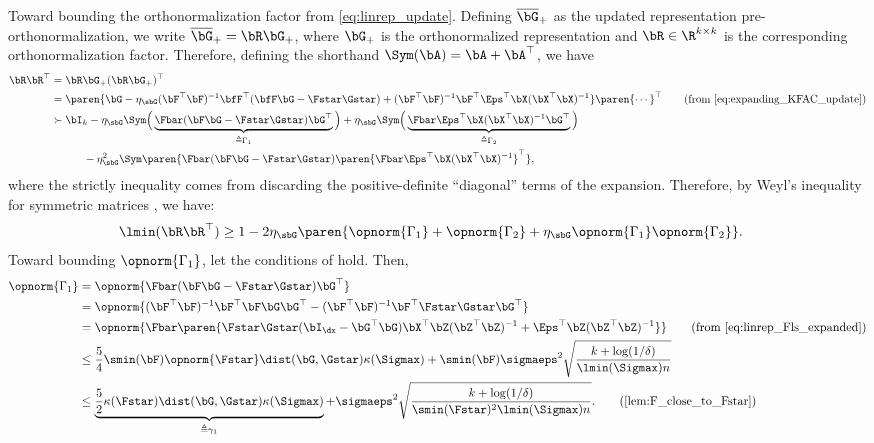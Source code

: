 Toward bounding the orthonormalization factor from \eqref{eq:linrep_update}. Defining $\overline\bG_+$ as the updated representation pre-orthonormalization, we write $\overline\bG_+ = \bR \bG_+$,
where $\bG_+$ is the orthonormalized representation and $\bR \in \R^{k \times k}$ is the corresponding orthonormalization factor. Therefore, defining the shorthand $\Sym(\bA) = \bA + \bA^\top$, we have
\begin{align*}
    \bR\bR^\top &= \bR \bG_+ (\bR \bG_+)^\top \\
    &= \paren{\bG - \eta_\sbG (\bF^\top \bF)^{-1}\bfF^\top (\bfF \bG - \Fstar \Gstar) + (\bF^\top \bF)^{-1}\bF^\top \Eps^\top \bX (\bX^\top \bX)^{-1}} \paren{\cdots}^\top \tag{from \eqref{eq:expanding_KFAC_update}}\\
    &\succ \bI_{k} - \eta_\sbG \Sym\Big(\underbrace{\Fbar(\bF\bG - \Fstar \Gstar)\bG^\top}_{\triangleq \Gamma_1}\Big) + \eta_\sbG \Sym\Big(\underbrace{\Fbar \Eps^\top \bX (\bX^\top \bX)^{-1} \bG^\top}_{\triangleq \Gamma_2}\Big) \\
    &\qquad \quad - \eta_\sbG^2 \Sym\paren{\Fbar(\bF\bG - \Fstar \Gstar)\paren{\Fbar \Eps^\top \bX (\bX^\top \bX)^{-1}}^\top},
\end{align*}
where the strictly inequality comes from discarding the positive-definite ``diagonal'' terms of the expansion. Therefore, by Weyl's inequality for symmetric matrices \cite{horn2012matrix}, we have:
\begin{align*}
    \lmin(\bR \bR^\top) &\geq 1 - 2\eta_\sbG \paren{\opnorm{\Gamma_1} + \opnorm{\Gamma_2} + \eta_\sbG\opnorm{\Gamma_1}\opnorm{\Gamma_2}}.
\end{align*}
Toward bounding $\opnorm{\Gamma_1}$, let the conditions of  hold. Then,
\begin{align*}
    \opnorm{\Gamma_1} &= \opnorm{\Fbar(\bF\bG - \Fstar \Gstar)\bG^\top} \\
    &= \opnorm{(\bF^\top \bF)^{-1} \bF^\top \bF \bG \bG^\top - (\bF^\top \bF)^{-1} \bF^\top\Fstar \Gstar \bG^\top} \\
    &= \opnorm{\Fbar \paren{\Fstar \Gstar (\bI_{\dx} - \bG^\top \bG) \bX^\top \bZ (\bZ^\top \bZ)^{-1} + \Eps^\top \bZ (\bZ^\top \bZ)^{-1}} } \tag{from \eqref{eq:linrep_Fls_expanded}} \\
    &\leq \frac{5}{4}\smin(\bF) \opnorm{\Fstar} \dist(\bG, \Gstar) \kappa(\Sigmax) + \smin(\bF) \sigmaeps^2 \sqrt{\frac{k + \log(1/\delta)}{\lmin(\Sigmax) n}} \\
    &\leq \underbrace{\frac{5}{2}\kappa(\Fstar) \dist(\bG, \Gstar) \kappa(\Sigmax)}_{\triangleq \gamma_1} + \sigmaeps^2 \sqrt{\frac{k + \log(1/\delta)}{\smin(\Fstar)^2\lmin(\Sigmax) n}}. \tag{\Cref{lem:F_close_to_Fstar}}
\end{align*}
